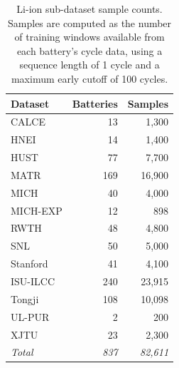 \begin{table}[t]
\centering
\caption{Li-ion sub-dataset sample counts.
Samples are computed as the number of training windows available from each battery's cycle data, using a sequence length of 1 cycle and a maximum early cutoff of 100 cycles.}
\label{tab:liion_subsets}
\small
\begin{tabular*}{\tblwidth}{@{}LRR@{}}
\toprule
\textbf{Dataset} & \textbf{Batteries} & \textbf{Samples} \\
\midrule
CALCE    &  13 &  1,300 \\
HNEI     &  14 &  1,400 \\
HUST     &  77 &  7,700 \\
MATR     & 169 & 16,900 \\
MICH     &  40 &  4,000 \\
MICH-EXP &  12 &    898 \\
RWTH     &  48 &  4,800 \\
SNL      &  50 &  5,000 \\
Stanford &  41 &  4,100 \\
ISU-ILCC & 240 & 23,915 \\
Tongji   & 108 & 10,098 \\
UL-PUR   &   2 &    200 \\
XJTU     &  23 &  2,300 \\
\midrule
\textit{Total} & \textit{837} & \textit{82,611} \\
\bottomrule
\end{tabular*}
\end{table}

